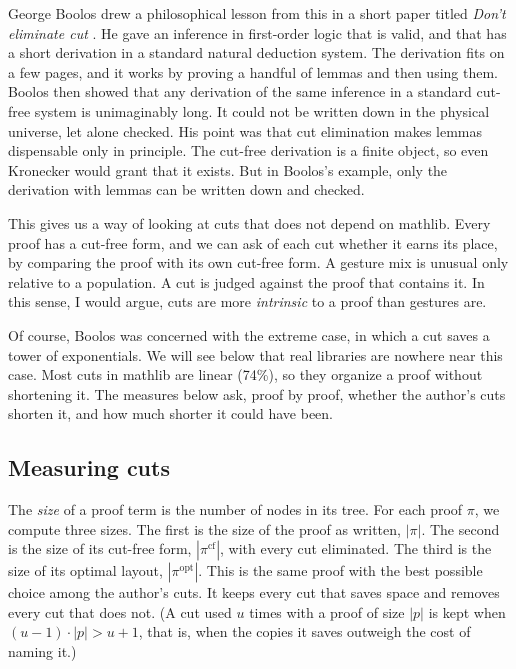 \documentclass{article}
\begin{document}
George Boolos drew a philosophical lesson from this in a short paper titled \textit{Don't eliminate cut} \textit{\parencite{boolos1984}}. He gave an
inference in first-order logic that is valid, and that has a short derivation in a standard natural deduction system.
The derivation fits on a few pages, and it works by proving a handful of lemmas and then using them. Boolos then showed
that any derivation of the same inference in a standard cut-free system is unimaginably long. It could not be written
down in the physical universe, let alone checked. His point was that cut elimination makes lemmas dispensable only in principle. The cut-free derivation is a finite
object, so even Kronecker would grant that it exists. But in Boolos's example, only the derivation with lemmas can be
written down and checked.

This gives us a way of looking at cuts that does not depend on mathlib. Every proof has a cut-free form, and we can ask of each cut whether it earns its place, by comparing the proof with its own
cut-free form. A gesture mix is unusual only relative to a population. A cut is judged
against the proof that contains it. In this sense, I would argue, cuts are more \textit{intrinsic} to a proof
than gestures are.

Of course, Boolos was concerned with the extreme case, in which a cut saves a tower of exponentials. We will see below
that real libraries are nowhere near this case. Most cuts in mathlib are linear (74\%), so they organize a proof
without shortening it. The measures below ask, proof by proof, whether the author's cuts shorten it, and how much
shorter it could have been.

\subsection{Measuring cuts}

The \textit{size} of a proof term is the number of nodes in its tree. For each proof $\pi$, we compute three sizes.
The first is the size of the proof as written, $|\pi|$. The second is the size of its cut-free form,
$|\pi^{\mathrm{cf}}|$, with every cut eliminated. The third is the size of its optimal layout, $|\pi^{\mathrm{opt}}|$.
This is the same proof with the best possible choice among the author's cuts. It keeps every cut that saves space and
removes every cut that does not. (A cut used $u$ times with a proof of size $|p|$ is kept when
$(u-1)\cdot|p| > u+1$, that is, when the copies it saves outweigh the cost of naming it.)
\end{document}
